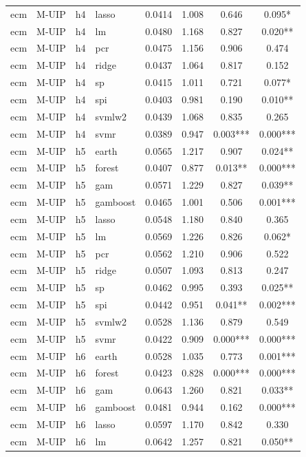 \begin{ThreePartTable}
\begin{longtable}[t]{llclcccc}
ecm & M-UIP & h4 & lasso & 0.0414 & 1.008 & 0.646 & 0.095*\\
ecm & M-UIP & h4 & lm & 0.0480 & 1.168 & 0.827 & 0.020**\\
ecm & M-UIP & h4 & pcr & 0.0475 & 1.156 & 0.906 & 0.474\\
ecm & M-UIP & h4 & ridge & 0.0437 & 1.064 & 0.817 & 0.152\\
ecm & M-UIP & h4 & sp & 0.0415 & 1.011 & 0.721 & 0.077*\\
ecm & M-UIP & h4 & spi & 0.0403 & 0.981 & 0.190 & 0.010**\\
ecm & M-UIP & h4 & svmlw2 & 0.0439 & 1.068 & 0.835 & 0.265\\
ecm & M-UIP & h4 & svmr & 0.0389 & 0.947 & 0.003*** & 0.000***\\
\addlinespace
ecm & M-UIP & h5 & earth & 0.0565 & 1.217 & 0.907 & 0.024**\\
ecm & M-UIP & h5 & forest & 0.0407 & 0.877 & 0.013** & 0.000***\\
ecm & M-UIP & h5 & gam & 0.0571 & 1.229 & 0.827 & 0.039**\\
ecm & M-UIP & h5 & gamboost & 0.0465 & 1.001 & 0.506 & 0.001***\\
ecm & M-UIP & h5 & lasso & 0.0548 & 1.180 & 0.840 & 0.365\\
ecm & M-UIP & h5 & lm & 0.0569 & 1.226 & 0.826 & 0.062*\\
ecm & M-UIP & h5 & pcr & 0.0562 & 1.210 & 0.906 & 0.522\\
ecm & M-UIP & h5 & ridge & 0.0507 & 1.093 & 0.813 & 0.247\\
ecm & M-UIP & h5 & sp & 0.0462 & 0.995 & 0.393 & 0.025**\\
ecm & M-UIP & h5 & spi & 0.0442 & 0.951 & 0.041** & 0.002***\\
ecm & M-UIP & h5 & svmlw2 & 0.0528 & 1.136 & 0.879 & 0.549\\
ecm & M-UIP & h5 & svmr & 0.0422 & 0.909 & 0.000*** & 0.000***\\
\addlinespace
ecm & M-UIP & h6 & earth & 0.0528 & 1.035 & 0.773 & 0.001***\\
ecm & M-UIP & h6 & forest & 0.0423 & 0.828 & 0.000*** & 0.000***\\
ecm & M-UIP & h6 & gam & 0.0643 & 1.260 & 0.821 & 0.033**\\
ecm & M-UIP & h6 & gamboost & 0.0481 & 0.944 & 0.162 & 0.000***\\
ecm & M-UIP & h6 & lasso & 0.0597 & 1.170 & 0.842 & 0.330\\
ecm & M-UIP & h6 & lm & 0.0642 & 1.257 & 0.821 & 0.050**\\

\end{longtable}
\end{ThreePartTable}
